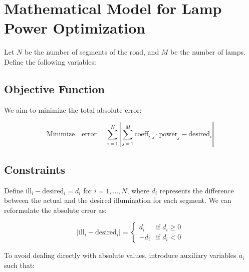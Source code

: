 \documentclass{article}
\begin{document}
\section*{Mathematical Model for Lamp Power Optimization}

Let \( N \) be the number of segments of the road, and \( M \) be the number of lamps. Define the following variables:

\]

\subsection*{Objective Function}

We aim to minimize the total absolute error:

\[
\text{Minimize} \quad \text{error} = \sum_{i=1}^{N} |\sum_{j=1}^{M} \text{coeff}_{i,j} \cdot \text{power}_j - \text{desired}_i|
\]

\subsection*{Constraints}

Define \( \text{ill}_i - \text{desired}_i = d_i \) for \( i = 1, \ldots, N \), where \( d_i \) represents the difference between the actual and the desired illumination for each segment. We can reformulate the absolute error as:

\[
|\text{ill}_i - \text{desired}_i| = \begin{cases} 
d_i & \text{if } d_i \geq 0 \\ 
-d_i & \text{if } d_i < 0 
\end{cases}
\]

To avoid dealing directly with absolute values, introduce auxiliary variables \( u_i \) such that:
\end{document}
